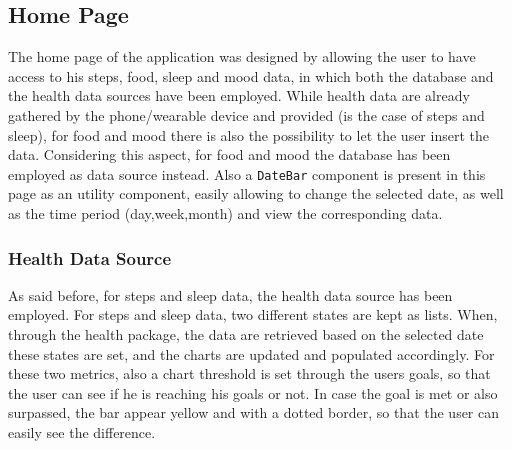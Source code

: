 \subsection{Home Page}
The home page of the application was designed by allowing the user to have access to his steps, food, sleep and mood data, in which both the database and the health data sources have been employed. While health data are already gathered by the phone/wearable device and provided (is the case of steps and sleep), for food and mood there is also the possibility to let the user insert the data. Considering this aspect, for food and mood the database has been employed as data source instead. Also a \texttt{DateBar} component is present in this page as an utility component, easily allowing to change the selected date, as well as the time period (day,week,month) and view the corresponding data.
\subsubsection{Health Data Source}
As said before, for steps and sleep data, the health data source has been employed. For steps and sleep data, two different states are kept as lists. When, through the health package, the data are retrieved based on the selected date these states are set, and the charts are updated and populated accordingly. For these two metrics, also a chart threshold is set through the users goals, so that the user can see if he is reaching his goals or not. In case the goal is met or also surpassed, the bar appear yellow and with a dotted border, so that the user can easily see the difference. 

